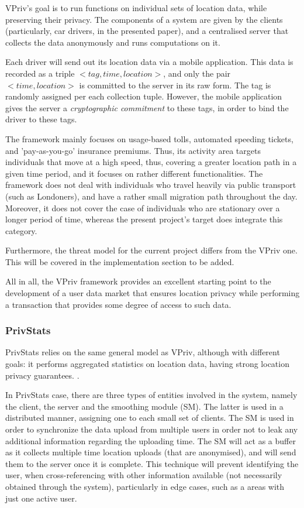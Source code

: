 VPriv's goal is to run functions on individual sets of location data, while preserving their privacy. The components of a system are given by the clients (particularly, car drivers, in the presented paper), and a centralised server that collects the data anonymously and runs computations on it.

Each driver will send out its location data via a mobile application. This data is recorded as a triple $<tag, time, location>$, and only the pair $<time, location>$ is committed to the server in its raw form. The tag is randomly assigned per each collection tuple. However, the mobile application gives the server a \textit{cryptographic commitment} to these tags, in order to bind the driver to these tags.

The framework mainly focuses on usage-based tolls, automated speeding tickets, and 'pay-as-you-go' insurance premiums. Thus, its activity area targets individuals that move at a high speed, thus, covering a greater location path in a given time period, and it focuses on rather different functionalities. The framework does not deal with individuals who travel heavily via public transport (such as Londoners), and have a rather small migration path throughout the day. Moreover, it does not cover the case of individuals who are stationary over a longer period of time, whereas the present project's target does integrate this category. 

Furthermore, the threat model for the current project differs from the VPriv one. This will be covered in the implementation section to be added.

All in all, the VPriv framework provides an excellent starting point to the development of a user data market that ensures location privacy while performing a transaction that provides some degree of access to such data.

\subsubsection{PrivStats}
PrivStats relies on the same general model as VPriv, although with different goals: it performs aggregated statistics on location data, having strong location privacy guarantees. \cite{privstats}.

In PrivStats case, there are three types of entities involved in the system, namely the client, the server and the smoothing module (SM). The latter is used in a distributed manner, assigning one to each small set of clients. The SM is used in order to synchronize the data upload from multiple users in order not to leak any additional information regarding the uploading time. The SM will act as a buffer as it collects multiple time location uploads (that are anonymised), and will send them to the server once it is complete. This technique will prevent identifying the user, when cross-referencing with other information available (not necessarily obtained through the system), particularly in edge cases, such as a areas with just one active user.

